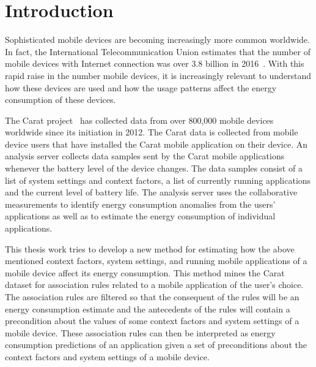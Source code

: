\section{Introduction}


Sophisticated mobile devices are becoming increasingly more common worldwide. In fact, the International Telecommunication Union estimates that the number of mobile devices with Internet connection was over 3.8 billion in 2016~\cite{ITUstats}. With this rapid raise in the number mobile devices, it is increasingly relevant to understand how these devices are used and how the usage patterns affect the energy consumption of these devices.    

The Carat project~\cite{Oliner:2012:CED:2387858.2387864, Oliner:2013:CCE:2517351.2517354, 7840871, PELTONEN201671, 7146507} has collected data from over 800,000 mobile devices worldwide since its initiation in 2012. The Carat data is collected from mobile device users that have installed the Carat mobile application on their device. An analysis server collects data samples sent by the Carat mobile applications whenever the battery level of the device changes. The data samples consist of a list of system settings and context factors, a list of currently running applications and the current level of battery life. The analysis server uses the collaborative measurements to identify energy consumption anomalies from the users' applications as well as to estimate the energy consumption of individual applications.

This thesis work tries to develop a new method for estimating how the above mentioned context factors, system settings, and running mobile applications of a mobile device affect its energy consumption. This method mines the Carat dataset for association rules related to a mobile application of the user's choice. The association rules are filtered so that the consequent of the rules will be an energy consumption estimate and the antecedents of the rules will contain a precondition about the values of some context factors and system settings of a mobile device. These association rules can then be interpreted as energy consumption predictions of an application given a set of preconditions about the context factors and system settings of a mobile device.      

